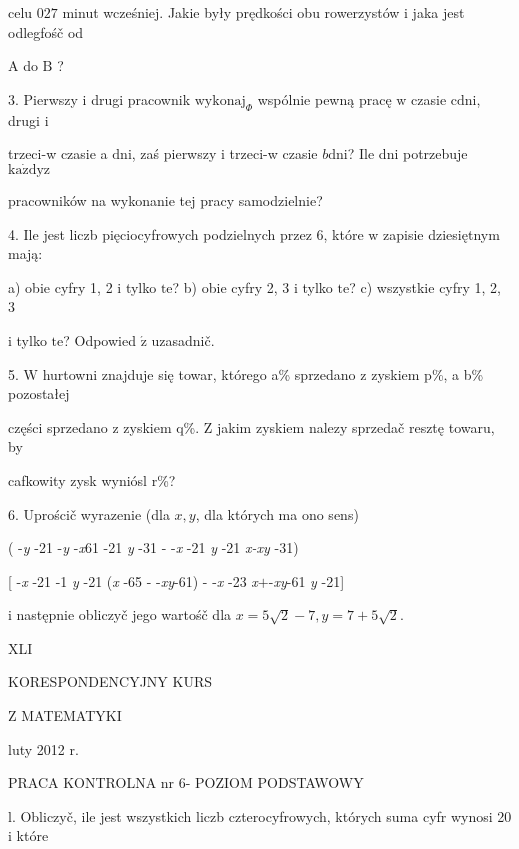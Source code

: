 \documentclass[a4paper,12pt]{article}
\begin{document}
celu $027$ minut wcześniej. Jakie były prędkości obu rowerzystów $\mathrm{i}$ jaka jest odlegfośč od

A do $\mathrm{B}$ ?

3. Pierwszy $\mathrm{i}$ drugi pracownik $\mathrm{w}\mathrm{y}\mathrm{k}\mathrm{o}\mathrm{n}\mathrm{a}\mathrm{j}_{\Phi}$ wspólnie pewną pracę $\mathrm{w}$ czasie $\mathrm{c} \mathrm{d}\mathrm{n}\mathrm{i}$, drugi $\mathrm{i}$

trzeci-w czasie a $\mathrm{d}\mathrm{n}\mathrm{i}$, zaś pierwszy $\mathrm{i}$ trzeci-w czasie $b\mathrm{d}\mathrm{n}\mathrm{i}$? Ile dni potrzebuje $\mathrm{k}\mathrm{a}\dot{\mathrm{z}}\mathrm{d}\mathrm{y}\mathrm{z}$

pracowników na wykonanie tej pracy samodzielnie?

4. Ile jest liczb pięciocyfrowych podzielnych przez 6, które $\mathrm{w}$ zapisie dziesiętnym mają:

a) obie cyfry 1, 2 $\mathrm{i}$ tylko $\mathrm{t}\mathrm{e}$? b) obie cyfry 2, 3 $\mathrm{i}$ tylko $\mathrm{t}\mathrm{e}$? c) wszystkie cyfry 1, 2, 3

$\mathrm{i}$ tylko $\mathrm{t}\mathrm{e}$? Odpowied $\acute{\mathrm{z}}$ uzasadnič.

5. $\mathrm{W}$ hurtowni znajduje się towar, którego a\% sprzedano $\mathrm{z}$ zyskiem p\%, a b\% pozostałej

części sprzedano $\mathrm{z}$ zyskiem q\%. $\mathrm{Z}$ jakim zyskiem nalezy sprzedač resztę towaru, by

cafkowity zysk wyniósl r\%?

6. Uprościč wyrazenie (dla $x, y$, dla których ma ono sens)

( -{\it y} -21 -{\it y} -{\it x}61 -21 {\it y} -31 - -{\it x} -21 {\it y} -21 {\it x-xy} -31)

[ -{\it x} -21 -1 {\it y} -21 ({\it x} -65 - -{\it xy}-61) - -{\it x} -23 {\it x}$+$-{\it xy}-61 {\it y} -21]

$\mathrm{i}$ następnie obliczyč jego wartośč dla $x=5\sqrt{2}-7, y=7+5\sqrt{2}.$





XLI

KORESPONDENCYJNY KURS

Z MATEMATYKI

luty 2012 r.

PRACA KONTROLNA nr 6- POZIOM PODSTAWOWY

l. Obliczyč, ile jest wszystkich liczb czterocyfrowych, których suma cyfr wynosi 20 $\mathrm{i}$ które
\end{document}
